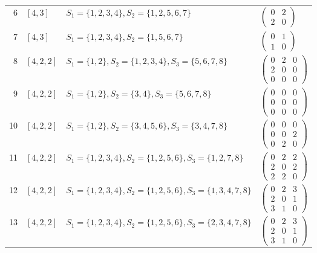\begin{longtable}{@{}r>{\raggedright\arraybackslash}p{1.5cm}>{\raggedright\arraybackslash}p{8.4cm}>{\raggedright\arraybackslash}p{4.2cm}@{}}
6 & $[4,3]$ & $S_{1}=\{1,2,3,4\}, S_{2}=\{1,2,5,6,7\}$ & $\left(\begin{smallmatrix}0 & 2\\2 & 0\end{smallmatrix}\right)$ \\
7 & $[4,3]$ & $S_{1}=\{1,2,3,4\}, S_{2}=\{1,5,6,7\}$ & $\left(\begin{smallmatrix}0 & 1\\1 & 0\end{smallmatrix}\right)$ \\
8 & $[4,2,2]$ & $S_{1}=\{1,2\}, S_{2}=\{1,2,3,4\}, S_{3}=\{5,6,7,8\}$ & $\left(\begin{smallmatrix}0 & 2 & 0\\2 & 0 & 0\\0 & 0 & 0\end{smallmatrix}\right)$ \\
9 & $[4,2,2]$ & $S_{1}=\{1,2\}, S_{2}=\{3,4\}, S_{3}=\{5,6,7,8\}$ & $\left(\begin{smallmatrix}0 & 0 & 0\\0 & 0 & 0\\0 & 0 & 0\end{smallmatrix}\right)$ \\
10 & $[4,2,2]$ & $S_{1}=\{1,2\}, S_{2}=\{3,4,5,6\}, S_{3}=\{3,4,7,8\}$ & $\left(\begin{smallmatrix}0 & 0 & 0\\0 & 0 & 2\\0 & 2 & 0\end{smallmatrix}\right)$ \\
11 & $[4,2,2]$ & $S_{1}=\{1,2,3,4\}, S_{2}=\{1,2,5,6\}, S_{3}=\{1,2,7,8\}$ & $\left(\begin{smallmatrix}0 & 2 & 2\\2 & 0 & 2\\2 & 2 & 0\end{smallmatrix}\right)$ \\
12 & $[4,2,2]$ & $S_{1}=\{1,2,3,4\}, S_{2}=\{1,2,5,6\}, S_{3}=\{1,3,4,7,8\}$ & $\left(\begin{smallmatrix}0 & 2 & 3\\2 & 0 & 1\\3 & 1 & 0\end{smallmatrix}\right)$ \\
13 & $[4,2,2]$ & $S_{1}=\{1,2,3,4\}, S_{2}=\{1,2,5,6\}, S_{3}=\{2,3,4,7,8\}$ & $\left(\begin{smallmatrix}0 & 2 & 3\\2 & 0 & 1\\3 & 1 & 0\end{smallmatrix}\right)$ \\

\end{longtable}
